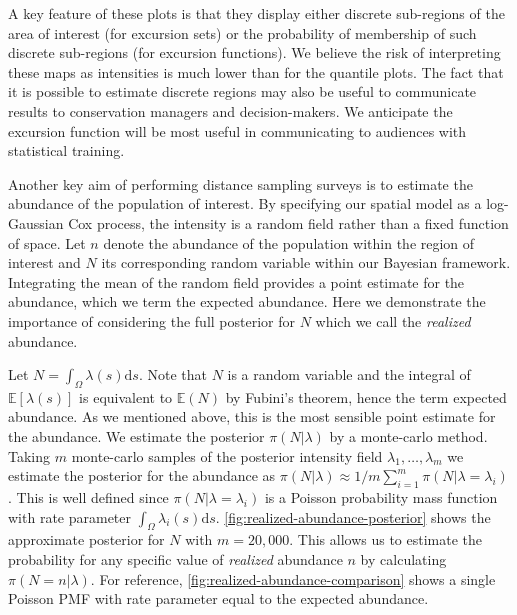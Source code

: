 \documentclass[preprint,12pt]{elsarticle}
\begin{document}
  A key feature of these plots is that they display either discrete sub-regions of the area of interest (for excursion sets) or the probability of membership of such discrete sub-regions (for excursion functions).  We believe the risk of interpreting these maps as intensities is much lower than for the quantile plots.  The fact that it is possible to estimate discrete regions may also be useful to communicate results to conservation managers and decision-makers.  We anticipate the excursion function will be most useful in communicating to audiences with statistical training.

Another key aim of performing distance sampling surveys is to estimate the abundance of the population of interest.  By specifying our spatial model as a log-Gaussian Cox process, the intensity is a random field rather than a fixed function of space. Let $n$ denote the abundance of the population within the region of interest and $N$ its corresponding random variable within our Bayesian framework.  Integrating the mean of the random field provides a point estimate for the abundance, which we term the expected abundance.  Here we demonstrate the importance of considering the full posterior for $N$ which we call the \textit{realized} abundance.

Let $N = \int_{\Omega}\lambda(s)\mathrm{d}s$. Note that $N$ is a random variable and the integral of $\mathbb{E}[\lambda(s)]$ is equivalent to $\mathbb{E}(N)$ by Fubini's theorem, hence the term expected abundance.  As we mentioned above, this is the most sensible point estimate for the abundance.  We estimate the posterior $\pi(N | \lambda)$ by a monte-carlo method.  Taking $m$ monte-carlo samples of the posterior intensity field $\lambda_1, \ldots, \lambda_m$ we estimate the posterior for the abundance as $\pi(N | \lambda) \approx 1 / m \sum_{i=1}^m \pi (N | \lambda = \lambda_i)$. This is well defined since $\pi(N | \lambda = \lambda_i)$ is a Poisson probability mass function with rate parameter $\int_{\Omega}\lambda_i(s)\mathrm{d}s$. \autoref{fig:realized-abundance-posterior} shows the approximate posterior for $N$ with $m = 20,000$.  This allows us to estimate the probability for any specific value of \textit{realized} abundance $n$ by calculating $\pi(N = n | \lambda)$.  For reference, \autoref{fig:realized-abundance-comparison} shows a single Poisson PMF with rate parameter equal to the expected abundance.
\end{document}
